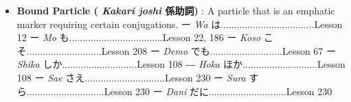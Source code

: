 \begin{itemize}
\item \textbf{Bound Particle ( \emph{Kakari joshi }係助詞) }: A particle that is an emphatic marker requiring certain conjugations. \hfill\break
\hfill\break
ー \emph{Wa }は\dothyp{}\dothyp{}\dothyp{}\dothyp{}\dothyp{}\dothyp{}\dothyp{}\dothyp{}\dothyp{}\dothyp{}\dothyp{}\dothyp{}\dothyp{}\dothyp{}\dothyp{}\dothyp{}\dothyp{}\dothyp{}\dothyp{}\dothyp{}\dothyp{}\dothyp{}\dothyp{}\dothyp{}\dothyp{}\dothyp{}\dothyp{}\dothyp{}\dothyp{}\dothyp{}\dothyp{}\dothyp{}\dothyp{}..Lesson 12 \hfill\break
ー \emph{Mo }も\dothyp{}\dothyp{}\dothyp{}\dothyp{}\dothyp{}\dothyp{}\dothyp{}\dothyp{}\dothyp{}\dothyp{}\dothyp{}\dothyp{}\dothyp{}\dothyp{}\dothyp{}\dothyp{}\dothyp{}\dothyp{}\dothyp{}\dothyp{}\dothyp{}\dothyp{}\dothyp{}\dothyp{}\dothyp{}\dothyp{}\dothyp{}\dothyp{}\dothyp{}\dothyp{}\dothyp{}\dothyp{}\dothyp{}..Lesson 22, 186 \hfill\break
ー \emph{Koso }こそ\dothyp{}\dothyp{}\dothyp{}\dothyp{}\dothyp{}\dothyp{}\dothyp{}\dothyp{}\dothyp{}\dothyp{}\dothyp{}\dothyp{}\dothyp{}\dothyp{}\dothyp{}\dothyp{}\dothyp{}\dothyp{}\dothyp{}\dothyp{}\dothyp{}\dothyp{}\dothyp{}\dothyp{}\dothyp{}\dothyp{}\dothyp{}.Lesson 208 \hfill\break
ー \emph{Demo }でも\dothyp{}\dothyp{}\dothyp{}\dothyp{}\dothyp{}\dothyp{}\dothyp{}\dothyp{}\dothyp{}\dothyp{}\dothyp{}\dothyp{}\dothyp{}\dothyp{}\dothyp{}\dothyp{}\dothyp{}\dothyp{}\dothyp{}\dothyp{}\dothyp{}\dothyp{}\dothyp{}\dothyp{}\dothyp{}\dothyp{}\dothyp{}Lesson 67 \hfill\break
ー \emph{Shika }しか\dothyp{}\dothyp{}\dothyp{}\dothyp{}\dothyp{}\dothyp{}\dothyp{}\dothyp{}\dothyp{}\dothyp{}\dothyp{}\dothyp{}\dothyp{}\dothyp{}\dothyp{}\dothyp{}\dothyp{}\dothyp{}\dothyp{}\dothyp{}\dothyp{}\dothyp{}\dothyp{}\dothyp{}\dothyp{}\dothyp{}\dothyp{}.Lesson 108 \hfill\break
― \emph{Hoka }ほか\dothyp{}\dothyp{}\dothyp{}\dothyp{}\dothyp{}\dothyp{}\dothyp{}\dothyp{}\dothyp{}\dothyp{}\dothyp{}\dothyp{}\dothyp{}\dothyp{}\dothyp{}\dothyp{}\dothyp{}\dothyp{}\dothyp{}\dothyp{}\dothyp{}\dothyp{}\dothyp{}\dothyp{}\dothyp{}\dothyp{}\dothyp{}.Lesson 108 \hfill\break
ー \emph{Sae }さえ\dothyp{}\dothyp{}\dothyp{}\dothyp{}\dothyp{}\dothyp{}\dothyp{}\dothyp{}\dothyp{}\dothyp{}\dothyp{}\dothyp{}\dothyp{}\dothyp{}\dothyp{}\dothyp{}\dothyp{}\dothyp{}\dothyp{}\dothyp{}\dothyp{}\dothyp{}\dothyp{}\dothyp{}\dothyp{}\dothyp{}\dothyp{}\dothyp{}\dothyp{}\dothyp{}Lesson 230 \hfill\break
ー \emph{Sura }すら\dothyp{}\dothyp{}\dothyp{}\dothyp{}\dothyp{}\dothyp{}\dothyp{}\dothyp{}\dothyp{}\dothyp{}\dothyp{}\dothyp{}\dothyp{}\dothyp{}\dothyp{}\dothyp{}\dothyp{}\dothyp{}\dothyp{}\dothyp{}\dothyp{}\dothyp{}\dothyp{}\dothyp{}\dothyp{}\dothyp{}\dothyp{}..Lesson 230 \hfill\break
ー \emph{Dani }だに\dothyp{}\dothyp{}\dothyp{}\dothyp{}\dothyp{}\dothyp{}\dothyp{}\dothyp{}\dothyp{}\dothyp{}\dothyp{}\dothyp{}\dothyp{}\dothyp{}\dothyp{}\dothyp{}\dothyp{}\dothyp{}\dothyp{}\dothyp{}\dothyp{}\dothyp{}\dothyp{}\dothyp{}\dothyp{}\dothyp{}\dothyp{}..Lesson 230 
\end{itemize}
      

